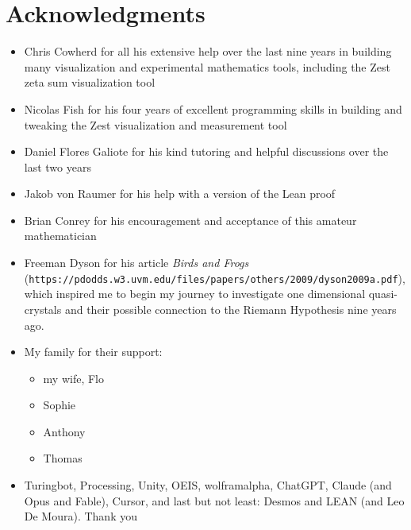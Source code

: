 \documentclass[11pt]{article}
\theoremstyle{definition}
\begin{document}
\clearpage

\section*{Acknowledgments}
\begin{itemize}
  \item Chris Cowherd for all his extensive help over the last nine years in building many visualization and experimental mathematics tools, including the Zest zeta sum visualization tool
  \item Nicolas Fish for his four years of excellent programming skills in building and tweaking the Zest visualization and measurement tool
  \item Daniel Flores Galiote for his kind tutoring and helpful discussions over the last two years
  \item Jakob von Raumer for his help with a version of the Lean proof
  \item Brian Conrey for his encouragement and acceptance of this amateur mathematician
  \item Freeman Dyson for his article {\it Birds and Frogs} \\(\texttt {\small https://pdodds.w3.uvm.edu/files/papers/others/2009/dyson2009a.pdf}), which inspired me to begin my journey to investigate one dimensional quasi-crystals and their possible connection to the Riemann Hypothesis nine years ago.
  \item My family for their support:
    \begin{itemize}
      \item my wife, Flo
      \item Sophie
      \item Anthony
      \item Thomas
    \end{itemize}
  \item Turingbot, Processing, Unity, OEIS, wolframalpha, ChatGPT, Claude (and Opus and Fable), Cursor, and last but not least: Desmos and LEAN (and Leo De Moura).  Thank you
\end{itemize}
\end{document}

